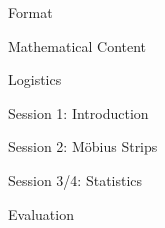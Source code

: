 \documentclass{beamer}  %
\begin{document}
\begin{frame}{Format}

\end{frame}   

\begin{frame}{Mathematical Content}

\end{frame}

\begin{frame}{Logistics}

\end{frame}

\begin{frame}{Session 1: Introduction}

\end{frame}

\begin{frame}{Session 2: M\"{o}bius Strips}

\end{frame}

\begin{frame}{Session 3/4: Statistics}

\end{frame}


\begin{frame}{Evaluation}

\end{frame}
\end{document}
